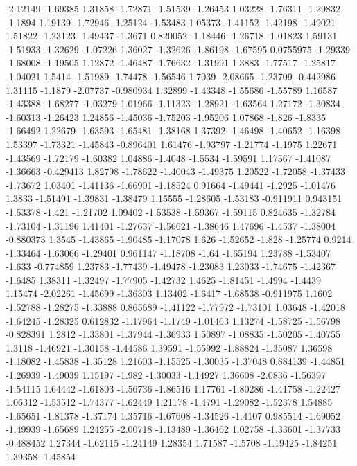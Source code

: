 \documentclass[9pt]{article}
\theoremstyle{plain}
\theoremstyle{definition}
\theoremstyle{remark}
\numberwithin{equation}{section}
\begin{document}
-2.12149
-1.69385
1.31858
-1.72871
-1.51539
-1.26453
1.03228
-1.76311
-1.29832
-1.1894
1.19139
-1.72946
-1.25124
-1.53483
1.05373
-1.41152
-1.42198
-1.49021
1.51822
-1.23123
-1.49437
-1.3671
0.820052
-1.18446
-1.26718
-1.01823
1.59131
-1.51933
-1.32629
-1.07226
1.36027
-1.32626
-1.86198
-1.67595
0.0755975
-1.29339
-1.68008
-1.19505
1.12872
-1.46487
-1.76632
-1.31991
1.3883
-1.77517
-1.25817
-1.04021
1.5414
-1.51989
-1.74478
-1.56546
1.7039
-2.08665
-1.23709
-0.442986
1.31115
-1.1879
-2.07737
-0.980934
1.32899
-1.43348
-1.55686
-1.55789
1.16587
-1.43388
-1.68277
-1.03279
1.01966
-1.11323
-1.28921
-1.63564
1.27172
-1.30834
-1.60313
-1.26423
1.24856
-1.45036
-1.75203
-1.95206
1.07868
-1.826
-1.8335
-1.66492
1.22679
-1.63593
-1.65481
-1.38168
1.37392
-1.46498
-1.40652
-1.16398
1.53397
-1.73321
-1.45843
-0.896401
1.61476
-1.93797
-1.21774
-1.1975
1.22671
-1.43569
-1.72179
-1.60382
1.04886
-1.4048
-1.5534
-1.59591
1.17567
-1.41087
-1.36663
-0.429413
1.82798
-1.78622
-1.40043
-1.49375
1.20522
-1.72058
-1.37433
-1.73672
1.03401
-1.41136
-1.66901
-1.18524
0.91664
-1.49441
-1.2925
-1.01476
1.3833
-1.51491
-1.39831
-1.38479
1.15555
-1.28605
-1.53183
-0.911911
0.943151
-1.53378
-1.421
-1.21702
1.09402
-1.53538
-1.59367
-1.59115
0.824635
-1.32784
-1.73104
-1.31196
1.41401
-1.27637
-1.56621
-1.38646
1.47696
-1.4537
-1.38004
-0.880373
1.3545
-1.43865
-1.90485
-1.17078
1.626
-1.52652
-1.828
-1.25774
0.9214
-1.33464
-1.63066
-1.29401
0.961147
-1.18708
-1.64
-1.65194
1.23788
-1.53407
-1.633
-0.774859
1.23783
-1.77439
-1.49478
-1.23083
1.23033
-1.74675
-1.42367
-1.6485
1.38311
-1.32497
-1.77905
-1.42732
1.4625
-1.81451
-1.4994
-1.4439
1.15474
-2.02261
-1.45699
-1.36303
1.13402
-1.6417
-1.68538
-0.911975
1.1602
-1.52788
-1.28275
-1.33888
0.865689
-1.41122
-1.77972
-1.73101
1.03648
-1.42018
-1.64245
-1.28325
0.612832
-1.17964
-1.1749
-1.01463
1.13274
-1.58725
-1.56798
-0.828391
1.2812
-1.33801
-1.37944
-1.36933
1.50897
-1.08835
-1.50205
-1.40755
1.3118
-1.46921
-1.30158
-1.44586
1.39591
-1.55992
-1.88824
-1.35087
1.36598
-1.18082
-1.45838
-1.35128
1.21603
-1.15525
-1.30035
-1.37048
0.884139
-1.44851
-1.26939
-1.49039
1.15197
-1.982
-1.30033
-1.14927
1.36608
-2.0836
-1.56397
-1.54115
1.64442
-1.61803
-1.56736
-1.86516
1.17761
-1.80286
-1.41758
-1.22427
1.06312
-1.53512
-1.74377
-1.62449
1.21178
-1.4791
-1.29082
-1.52378
1.54885
-1.65651
-1.81378
-1.37174
1.35716
-1.67608
-1.34526
-1.4107
0.985514
-1.69052
-1.49939
-1.65689
1.24255
-2.00718
-1.13489
-1.36462
1.02758
-1.33601
-1.37733
-0.488452
1.27344
-1.62115
-1.24149
1.28354
1.71587
-1.5708
-1.19425
-1.84251
1.39358
-1.45854
\end{document}
